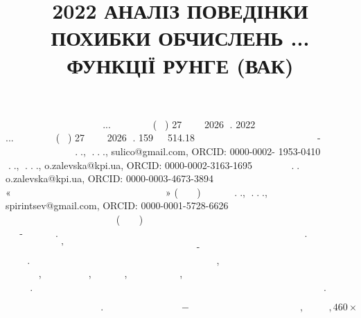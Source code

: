 \documentclass[12pt,a4paper]{article}
\begin{document}
\title{2022 АНАЛІЗ ПОВЕДІНКИ ПОХИБКИ ОБЧИСЛЕНЬ ... ФУНКЦІЇ РУНГЕ (ВАК)}
 ￿￿￿￿￿￿ ￿￿￿￿￿￿￿￿￿ ￿￿￿￿￿￿￿ ￿￿￿￿￿￿￿￿￿ ... ￿￿￿￿￿￿￿ ￿￿￿￿￿ (￿￿￿) 27 ￿￿￿￿￿￿ 2026 ￿. 2022 ￿￿￿￿￿￿ ￿￿￿￿￿￿￿￿￿ ￿￿￿￿￿￿￿ ￿￿￿￿￿￿￿￿￿ ... ￿￿￿￿￿￿￿ ￿￿￿￿￿ (￿￿￿) 27 ￿￿￿￿￿￿ 2026 ￿. 159 ￿￿￿ 514.18 ￿￿￿￿￿￿ ￿￿￿￿￿￿￿￿￿ ￿￿￿￿￿￿￿ ￿￿￿￿￿￿￿￿￿ ￿￿￿ ￿￿￿￿-￿￿￿￿￿￿￿￿￿￿￿￿ ￿￿￿￿￿￿￿ ￿￿￿￿￿ ￿￿￿￿￿￿￿￿￿ ￿.￿., ￿.￿.￿., sulico@gmail.com, ORCID: 0000-0002- 1953-0410 ￿￿￿￿￿￿￿￿￿ ￿.￿., ￿.￿.￿., o.zalevska@kpi.ua, ORCID: 0000-0002-3163-1695 ￿￿￿￿￿￿￿￿￿￿￿ ￿.￿. o.zalevska@kpi.ua, ORCID: 0000-0003-4673-3894 ￿￿￿￿￿￿￿￿￿￿￿￿ ￿￿￿￿￿￿￿￿￿ ￿￿￿￿￿￿￿￿￿￿￿ ￿￿￿￿￿￿￿ «￿￿￿￿￿￿￿￿￿ ￿￿￿￿￿￿￿￿￿￿￿￿￿ ￿￿￿￿￿￿￿￿ ￿￿￿￿￿ ￿￿￿￿￿ ￿￿￿￿￿￿￿￿￿￿￿» (￿￿￿￿￿￿￿) ￿￿￿￿￿￿￿￿￿ ￿.￿., ￿.￿.￿., spirintsev@gmail.com, ORCID: 0000-0001-5728-6626 ￿￿￿￿￿￿￿￿￿￿￿￿￿￿￿ ￿￿￿￿￿￿￿￿￿ ￿￿￿￿￿￿￿￿￿￿￿￿ ￿￿￿￿￿￿￿￿￿￿￿ ￿￿￿￿￿ ￿￿￿￿￿￿￿ ￿￿￿￿￿￿￿￿￿￿￿￿￿ (￿￿￿￿￿￿￿) ￿ ￿￿￿￿￿￿ ￿￿￿￿￿￿￿￿￿￿￿￿￿ ￿￿￿￿￿￿￿ ￿￿￿￿￿￿￿￿￿ ￿￿￿ ￿￿￿￿￿￿￿￿￿￿￿￿ ￿￿ ￿￿￿￿￿￿￿ ￿￿￿￿￿ ￿￿￿￿ -￿￿￿￿￿￿￿￿￿￿￿￿. ￿￿￿￿￿￿￿￿￿ ￿￿￿￿￿￿￿ ￿￿￿￿￿￿￿￿￿￿￿￿ ￿￿ ￿￿￿￿￿￿￿ ￿￿￿￿￿￿￿￿￿￿￿￿￿ ￿￿￿￿￿￿￿ ￿￿￿￿￿￿￿￿￿￿￿￿ ￿￿￿￿￿￿￿￿￿￿￿. ￿￿￿￿￿￿￿￿￿ ￿ ￿￿￿￿￿￿￿￿ ￿￿￿￿￿￿ ￿￿￿￿’￿￿￿￿￿￿￿ ￿￿￿￿￿￿￿￿ ￿￿￿￿￿￿￿￿￿￿￿￿ ￿￿￿￿￿￿ ￿￿￿￿￿￿ ￿￿￿￿- ￿￿￿￿￿￿￿ ￿￿ ￿￿￿￿￿￿￿￿￿￿￿￿ ￿￿￿￿￿￿￿￿￿￿ ￿ ￿￿￿￿￿￿￿￿￿ ￿￿￿￿￿￿ ￿￿￿￿￿￿￿￿. ￿ ￿￿￿ ￿￿￿ ￿￿￿￿￿￿￿￿￿ ￿￿￿￿￿￿￿￿￿￿￿￿ ￿￿￿￿￿￿￿￿￿￿￿￿ ￿￿￿￿￿ ￿￿￿￿￿￿￿ ￿￿￿￿￿￿, ￿￿￿ ￿￿￿￿￿￿￿￿￿￿￿￿ ￿￿￿￿￿￿￿￿￿￿ ￿￿￿￿￿￿￿ ￿￿ ￿￿￿￿￿￿￿￿￿￿￿ , ￿￿￿￿￿￿￿￿￿￿ ￿￿￿￿￿, ￿￿￿￿￿￿￿￿￿￿￿, ￿￿￿￿￿￿￿￿￿ ￿￿￿￿￿￿￿￿, ￿￿ ￿￿￿￿ ￿ ￿￿￿￿￿ ￿￿￿￿￿￿￿ ￿￿￿￿￿ ￿ ￿￿ ￿￿￿￿￿￿￿￿￿ ￿￿￿￿￿￿￿ ￿ ￿￿￿￿￿￿￿￿￿. ￿￿￿￿￿￿ ￿￿￿￿￿￿￿￿￿￿￿￿￿ ￿ ￿￿￿￿￿￿￿￿￿￿￿￿￿ ￿￿￿￿￿￿￿￿￿￿￿￿ ￿ ￿￿￿￿￿￿￿￿￿￿￿￿￿￿￿￿￿ ￿￿￿￿￿￿￿￿ ￿￿￿￿￿ ￿￿￿￿￿￿￿￿￿￿￿￿￿ ￿￿￿￿￿.
\par
\[￿￿￿￿￿￿￿￿￿￿￿￿￿￿￿￿￿￿￿￿￿￿￿￿￿￿￿￿￿￿￿￿￿￿￿.￿￿￿￿￿￿￿￿￿￿￿￿￿￿￿￿￿￿￿￿￿￿￿￿￿￿￿￿ - ￿￿￿￿￿￿￿￿￿￿￿￿￿￿￿￿￿￿￿￿￿￿￿￿￿￿￿￿￿￿￿￿￿￿￿￿￿￿￿￿, ￿￿￿￿￿￿￿￿￿, 460\times\]
\end{document}
